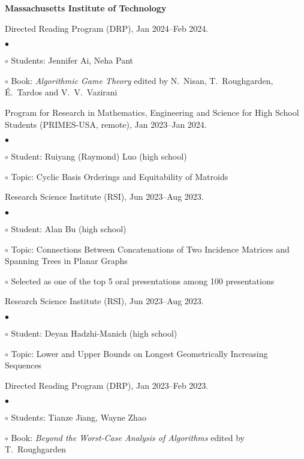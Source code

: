 \documentclass[margin,line]{res}
\newenvironment{list2}{
  \begin{list}{$\bullet$}{%
      \setlength{\itemsep}{0in}
      \setlength{\parsep}{0in} \setlength{\parskip}{0in}
      \setlength{\topsep}{0in} \setlength{\partopsep}{0in}
      \setlength{\leftmargin}{0.2in}}}{\end{list}}
\newenvironment{list3}{
  \begin{list}{\ding{113}}{%
      \setlength{\itemsep}{0.05in}
      \setlength{\parsep}{0.025in} \setlength{\parskip}{0in}
      \setlength{\topsep}{0in} \setlength{\partopsep}{0in}
      \setlength{\leftmargin}{0.17in}}}{\end{list}}
\begin{document}
\begin{resume}
{\bf Massachusetts Institute of Technology}\\
\vspace*{-.1in}
\begin{list3}
\item[] Directed Reading Program (DRP), Jan 2024--Feb 2024.
  \begin{list2}
  \item[$\circ$] Students: Jennifer Ai, Neha Pant
  \item[$\circ$] Book: \emph{Algorithmic Game Theory} edited by N.\ Nisan, T.\ Roughgarden, \'E.\ Tardos and V.\ V.\ Vazirani
  \end{list2}
\item[] Program for Research in Mathematics, Engineering and Science for High School Students (PRIMES-USA, remote), Jan 2023--Jan 2024.
  \begin{list2}
  \item[$\circ$] Student: Ruiyang (Raymond) Luo (high school)
  \item[$\circ$] Topic: Cyclic Basis Orderings and Equitability of Matroids
  \end{list2}
\item[] Research Science Institute (RSI), Jun 2023--Aug 2023.
  \begin{list2}
  \item[$\circ$] Student: Alan Bu (high school)
  \item[$\circ$] Topic: Connections Between Concatenations of Two Incidence Matrices and Spanning Trees in Planar Graphs
  \item[$\circ$] Selected as one of the top 5 oral presentations among 100 presentations
  \end{list2}
\item[] Research Science Institute (RSI), Jun 2023--Aug 2023.
  \begin{list2}
  \item[$\circ$] Student: Deyan Hadzhi-Manich (high school)
  \item[$\circ$] Topic: Lower and Upper Bounds on Longest Geometrically Increasing Sequences
  \end{list2}
\item[] Directed Reading Program (DRP), Jan 2023--Feb 2023.
  \begin{list2}
  \item[$\circ$] Students: Tianze Jiang, Wayne Zhao
  \item[$\circ$] Book: \emph{Beyond the Worst-Case Analysis of Algorithms} edited by T.\ Roughgarden
  \end{list2}

\end{list3}
\end{resume}
\end{document}
